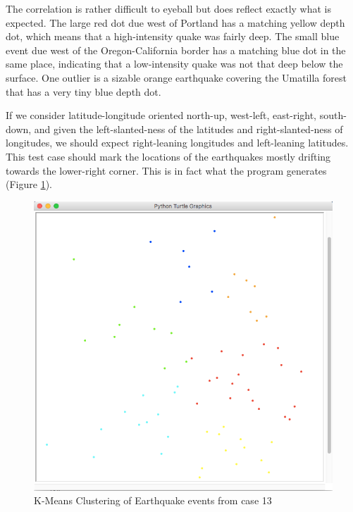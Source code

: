 The correlation is rather difficult to eyeball but does reflect exactly what is expected. The large red dot due west of Portland has a matching yellow depth dot, which means that a high-intensity quake was fairly deep. The small blue event due west of the Oregon-California border has a matching blue dot in the same place, indicating that a low-intensity quake was not that deep below the surface. One outlier is a sizable orange earthquake covering the Umatilla forest that has a very tiny blue depth dot.

If we consider latitude-longitude oriented north-up, west-left, east-right, south-down, and given the left-slanted-ness of the latitudes and right-slanted-ness of longitudes, we should expect right-leaning longitudes and left-leaning latitudes. This test case should mark the locations of the earthquakes mostly drifting towards the lower-right corner. This is in fact what the program generates (Figure \ref{fig:clusters}).

\begin{figure}[!h]
\centering
\includegraphics[scale=0.6]{clusters-nobg.png}
\caption{K-Means Clustering of Earthquake events from case 13}
\label{fig:clusters}
\end{figure}